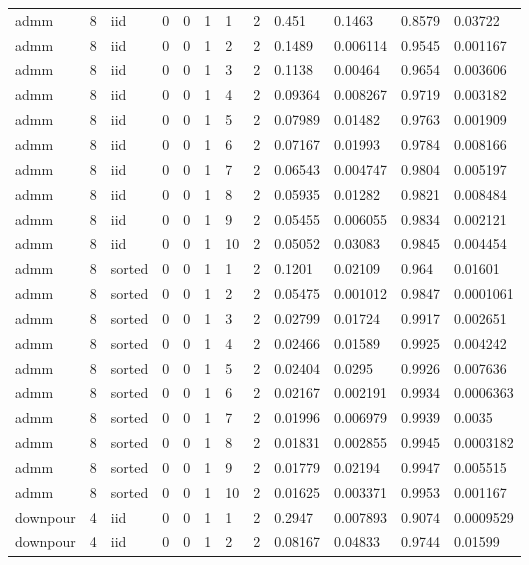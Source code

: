 \begin{tabular}{llllllllllll}
admm & 8 & iid & 0 & 0 & 1 & 1 & 2 & 0.451 & 0.1463 & 0.8579 & 0.03722 \\
admm & 8 & iid & 0 & 0 & 1 & 2 & 2 & 0.1489 & 0.006114 & 0.9545 & 0.001167 \\
admm & 8 & iid & 0 & 0 & 1 & 3 & 2 & 0.1138 & 0.00464 & 0.9654 & 0.003606 \\
admm & 8 & iid & 0 & 0 & 1 & 4 & 2 & 0.09364 & 0.008267 & 0.9719 & 0.003182 \\
admm & 8 & iid & 0 & 0 & 1 & 5 & 2 & 0.07989 & 0.01482 & 0.9763 & 0.001909 \\
admm & 8 & iid & 0 & 0 & 1 & 6 & 2 & 0.07167 & 0.01993 & 0.9784 & 0.008166 \\
admm & 8 & iid & 0 & 0 & 1 & 7 & 2 & 0.06543 & 0.004747 & 0.9804 & 0.005197 \\
admm & 8 & iid & 0 & 0 & 1 & 8 & 2 & 0.05935 & 0.01282 & 0.9821 & 0.008484 \\
admm & 8 & iid & 0 & 0 & 1 & 9 & 2 & 0.05455 & 0.006055 & 0.9834 & 0.002121 \\
admm & 8 & iid & 0 & 0 & 1 & 10 & 2 & 0.05052 & 0.03083 & 0.9845 & 0.004454 \\
admm & 8 & sorted & 0 & 0 & 1 & 1 & 2 & 0.1201 & 0.02109 & 0.964 & 0.01601 \\
admm & 8 & sorted & 0 & 0 & 1 & 2 & 2 & 0.05475 & 0.001012 & 0.9847 & 0.0001061 \\
admm & 8 & sorted & 0 & 0 & 1 & 3 & 2 & 0.02799 & 0.01724 & 0.9917 & 0.002651 \\
admm & 8 & sorted & 0 & 0 & 1 & 4 & 2 & 0.02466 & 0.01589 & 0.9925 & 0.004242 \\
admm & 8 & sorted & 0 & 0 & 1 & 5 & 2 & 0.02404 & 0.0295 & 0.9926 & 0.007636 \\
admm & 8 & sorted & 0 & 0 & 1 & 6 & 2 & 0.02167 & 0.002191 & 0.9934 & 0.0006363 \\
admm & 8 & sorted & 0 & 0 & 1 & 7 & 2 & 0.01996 & 0.006979 & 0.9939 & 0.0035 \\
admm & 8 & sorted & 0 & 0 & 1 & 8 & 2 & 0.01831 & 0.002855 & 0.9945 & 0.0003182 \\
admm & 8 & sorted & 0 & 0 & 1 & 9 & 2 & 0.01779 & 0.02194 & 0.9947 & 0.005515 \\
admm & 8 & sorted & 0 & 0 & 1 & 10 & 2 & 0.01625 & 0.003371 & 0.9953 & 0.001167 \\
downpour & 4 & iid & 0 & 0 & 1 & 1 & 2 & 0.2947 & 0.007893 & 0.9074 & 0.0009529 \\
downpour & 4 & iid & 0 & 0 & 1 & 2 & 2 & 0.08167 & 0.04833 & 0.9744 & 0.01599 \\

\end{tabular}
